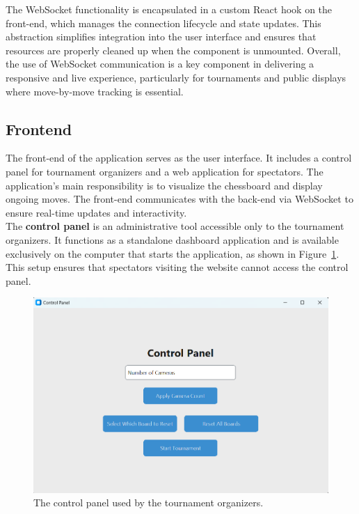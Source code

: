 The WebSocket functionality is encapsulated in a custom React hook on the front-end, which manages the connection lifecycle and state updates. This abstraction simplifies integration into the user interface and ensures that resources are properly cleaned up when the component is unmounted. Overall, the use of WebSocket communication is a key component in delivering a responsive and live experience, particularly for tournaments and public displays where move-by-move tracking is essential.

\subsection{Frontend}
The front-end of the application serves as the user interface. It includes a control panel for tournament organizers and a web application for spectators. The application's main responsibility is to visualize the chessboard and display ongoing moves. The front-end communicates with the back-end via WebSocket to ensure real-time updates and interactivity. \\

The \textbf{control panel} is an administrative tool accessible only to the tournament organizers. It functions as a standalone dashboard application and is available exclusively on the computer that starts the application, as shown in Figure~\ref{fig:control-panel}. This setup ensures that spectators visiting the website cannot access the control panel. \\

\begin{figure}[h!] \centering \includegraphics[width=0.75\linewidth]{figures/results/frontend/control-panel/control-panel.png} \caption[Control panel for tournament organizers]{The control panel used by the tournament organizers.}\label{fig:control-panel} \end{figure}

